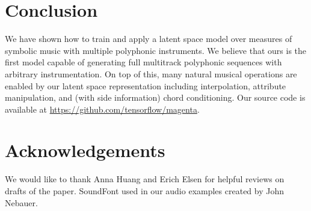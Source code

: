 \documentclass{article}
\begin{document}

\section{Conclusion}
We have shown how to train and apply a latent space model over measures of symbolic music with multiple polyphonic instruments.  We believe that ours is the first model capable of generating full multitrack polyphonic sequences with arbitrary instrumentation.  On top of this, many natural musical operations are enabled by our latent space representation including interpolation, attribute manipulation, and (with side information) chord conditioning.  Our source code is available at \url{https://github.com/tensorflow/magenta}.

\section{Acknowledgements}
We would like to thank Anna Huang and Erich Elsen for helpful reviews on drafts of the paper.  SoundFont used in our audio examples created by John Nebauer.



%
%
%
%
\end{document}
